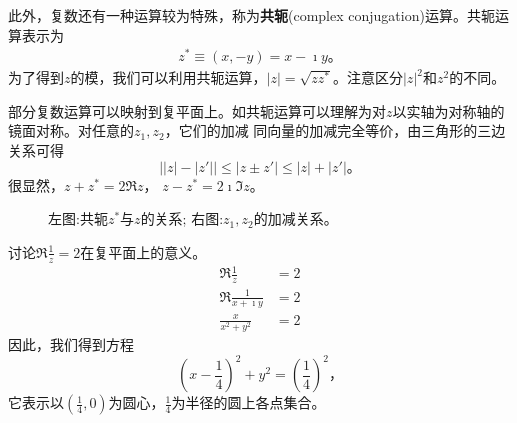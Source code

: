 此外，复数还有一种运算较为特殊，称为{\bf 共轭}(complex conjugation)运算。共轭运算表示为
\begin{align}
    z^{*} \equiv (x, -y) = x - \imath y \textrm{。}
\end{align}
为了得到$z$的模，我们可以利用共轭运算，$|z| = \sqrt{zz^{*}}$。注意区分$|z|^2$和$z^2$的不同。

部分复数运算可以映射到复平面上。如共轭运算可以理解为对$z$以实轴为对称轴的镜面对称。对任意的$z_1,z_2$，它们的加减
同向量的加减完全等价，由三角形的三边关系可得
\begin{equation}
    \left| |z|- |z'| \right| \leq |z \pm z'| \leq |z| + |z'| \textrm{。}
\end{equation}
很显然，$z+z^{*} = 2 \Re z$， $z-z^{*} = 2\imath \Im z$。
\begin{figure}
    \centering
    
\quad 
        
        \caption{左图:共轭$z^{*}$与$z$的关系; 右图:$z_1, z_2$的加减关系。}
    \end{figure}
\begin{examplebox}{讨论$\Re \frac{1}{z} = 2$在复平面上的意义。}
    \begin{align*}
        \Re \frac{1}{z} &= 2\\
        \Re \frac{1}{x+\imath y} &  = 2 \\
        \frac{x}{x^2 +y^2} & = 2
    \end{align*}
    因此，我们得到方程
    \begin{equation*}
        (x-\frac{1}{4})^2 + y^2 = \left( \frac{1}{4}\right)^2\textrm{，}
    \end{equation*}
    它表示以$(\frac{1}{4},0)$为圆心，$\frac{1}{4}$为半径的圆上各点集合。
    \end{examplebox}
        
